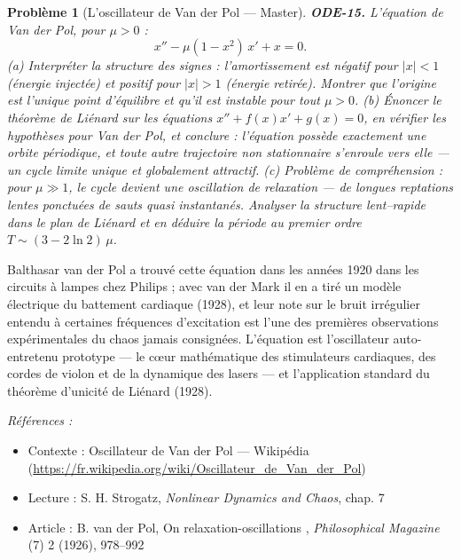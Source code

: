 \documentclass[11pt]{article}
\newtheorem{problem}{Problème}
\newenvironment{refs}{\par\small\noindent\emph{Références :}\begin{itemize}\setlength\itemsep{0pt}}{\end{itemize}\normalsize}
\begin{document}
\bigskip

\begin{problem}[{L'oscillateur de Van der Pol --- Master}]
\textbf{ODE-15.} L'équation de Van der Pol, pour $ \mu >0 $ :
\[ x'' - \mu (1 - x^2)\, x' + x = 0 . \]
(a) Interpréter la structure des signes : l'amortissement est négatif pour $ |x| <1 $
(énergie injectée) et positif pour $ |x| >1 $ (énergie retirée). Montrer que l'origine est
l'unique point d'équilibre et qu'il est instable pour tout $ \mu >0 $.
(b) Énoncer le théorème de Liénard sur les équations $ x'' + f(x) x' + g(x) = 0 $, en vérifier
les hypothèses pour Van der Pol, et conclure : l'équation possède exactement une orbite
périodique, et toute autre trajectoire non stationnaire s'enroule vers elle --- un cycle limite
unique et globalement attractif.
(c) Problème de compréhension : pour $ \mu \gg 1 $, le cycle devient une \textit{oscillation de
relaxation} --- de longues reptations lentes ponctuées de sauts quasi instantanés. Analyser la
structure lent--rapide dans le plan de Liénard et en déduire la période au premier ordre
$ T \sim (3 - 2\ln 2)\, \mu $.
\end{problem}

\noindent Balthasar van der Pol a trouvé cette équation dans les années 1920 dans les
circuits à lampes chez Philips ; avec van der Mark il en a tiré un modèle électrique du battement
cardiaque (1928), et leur note sur le \og{} bruit irrégulier \fg{} entendu à certaines fréquences
d'excitation est l'une des premières observations expérimentales du chaos jamais consignées.
L'équation est l'oscillateur auto-entretenu prototype --- le c\oe{}ur mathématique des stimulateurs
cardiaques, des cordes de violon et de la dynamique des lasers --- et l'application standard du
théorème d'unicité de Liénard (1928).

\begin{refs}
\item Contexte : Oscillateur de Van der Pol --- Wikipédia (\url{https://fr.wikipedia.org/wiki/Oscillateur_de_Van_der_Pol})
\item Lecture : S. H. Strogatz, \textit{Nonlinear Dynamics and Chaos}, chap. 7
\item Article : B. van der Pol, \og{} On relaxation-oscillations \fg{}, \textit{Philosophical Magazine} (7) 2 (1926), 978--992
\end{refs}

\bigskip
\end{document}
